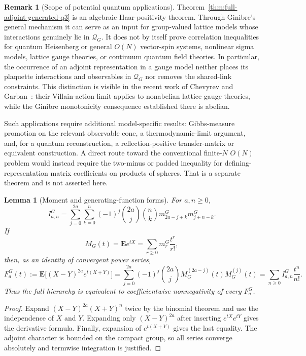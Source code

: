 \documentclass[11pt,reqno]{amsart}
\theoremstyle{plain}
\newtheorem{lemma}[theorem]{Lemma}
\theoremstyle{definition}
\newtheorem{remark}[theorem]{Remark}
\newcommand{\Qcone}{\mathcal Q}
\begin{document}
\begin{remark}[Scope of potential quantum applications]
\label{rem:quantum-application-scope}
Theorem~\ref{thm:full-adjoint-generated-q3} is an algebraic Haar-positivity
theorem.  Through Ginibre's general mechanism it can serve as an input for
group-valued lattice models whose interactions genuinely lie in
$\Qcone_G$.  It does not by itself prove correlation inequalities for quantum
Heisenberg or general $O(N)$ vector-spin systems, nonlinear sigma models,
lattice gauge theories, or continuum quantum field theories.  In particular,
the occurrence of an adjoint representation in a gauge model neither places
its plaquette interactions and observables in $\Qcone_G$ nor removes the
shared-link constraints.  This distinction is visible in the recent work of
Chevyrev and Garban~\cite[Thm.~1.5, Cor.~1.6, and Rem.~1.7]{ChevyrevGarban2025}:
their Villain-action limit applies to nonabelian lattice gauge theories, while
the Ginibre monotonicity consequence established there is abelian.

Such applications require additional model-specific results: Gibbs-measure
promotion on the relevant observable cone, a thermodynamic-limit argument,
and, for a quantum reconstruction, a reflection-positive transfer-matrix or
equivalent construction.  A direct route toward the conventional finite-$N$
$O(N)$ problem would instead require the two-minus or padded inequality for
defining-representation matrix coefficients on products of spheres.  That is
a separate theorem and is not asserted here.
\end{remark}

\begin{lemma}[Moment and generating-function forms]\label{lem:full-moment-form}
For $a,n\geq0$,
\[
 I^G_{a,n}
 =\sum_{j=0}^{2a}\sum_{k=0}^{n}
   (-1)^j\binom{2a}{j}\binom nk
   m^G_{2a-j+k}m^G_{j+n-k}.
\]
If
\[
 M_G(t)=\mathbf E e^{tX}
       =\sum_{r\geq0}m_r^G\frac{t^r}{r!},
\]
then, as an identity of convergent power series,
\[
 F_a^G(t):=\mathbf E\bigl[(X-Y)^{2a}e^{t(X+Y)}\bigr]
 =\sum_{j=0}^{2a}(-1)^j\binom{2a}{j}
   M_G^{(2a-j)}(t)M_G^{(j)}(t)
 =\sum_{n\geq0}I^G_{a,n}\frac{t^n}{n!}.
\]
Thus the full hierarchy is equivalent to coefficientwise nonnegativity of
every $F_a^G$.
\end{lemma}

\begin{proof}
Expand $(X-Y)^{2a}(X+Y)^n$ twice by the binomial theorem and use the
independence of $X$ and $Y$.  Expanding only $(X-Y)^{2a}$ after inserting
$e^{tX}e^{tY}$ gives the derivative formula.  Finally, expansion of
$e^{t(X+Y)}$ gives the last equality.  The adjoint character is bounded on
the compact group, so all series converge absolutely and termwise
integration is justified.
\end{proof}
\end{document}

